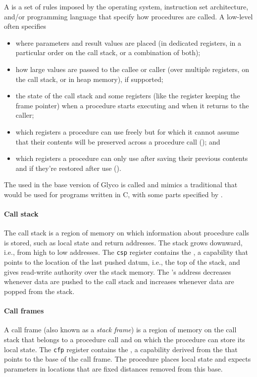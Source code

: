 \documentclass[main.tex]{subfiles}
\begin{document}
A \textbf{} is a set of rules imposed by the operating system, instruction set architecture, and/or programming language that specify how procedures are called. A low-level  often specifies
\begin{itemize}[noitemsep]
	\item where parameters and result values are placed (in dedicated registers, in a particular order on the call stack, or a combination of both);
	\item how large values are passed to the callee or caller (over multiple registers, on the call stack, or in heap memory), if supported;
	\item the state of the call stack and some registers (like the register keeping the frame pointer) when a procedure starts executing and when it returns to the caller;
	\item which registers a procedure can use freely but for which it cannot assume that their contents will be preserved across a procedure call (\textbf{}); and
	\item which registers a procedure can only use after saving their previous contents and if they're restored after use (\textbf{}).
\end{itemize}

The  used in the base version of Glyco is called \textbf{} and mimics a traditional  that would be used for programs written in C, with some parts specified by \cite[chapter~25]{riscv}.

\paragraph{Call stack} The call stack is a region of memory on which information about procedure calls is stored, such as local state and return addresses. The stack grows downward, i.e., from high to low addresses. The \texttt{csp} register contains the \textbf{}, a capability that points to the location of the last pushed datum, i.e., the top of the stack, and gives read-write authority over the stack memory. The 's address decreases whenever data are pushed to the call stack and increases whenever data are popped from the stack.

\paragraph{Call frames} A call frame (also known as a \emph{stack frame}) is a region of memory on the call stack that belongs to a procedure call and on which the procedure can store its local state. The \texttt{cfp} register contains the \textbf{}, a capability derived from the  that points to the base of the call frame. The procedure places local state and expects parameters in locations that are fixed distances removed from this base.
\end{document}
